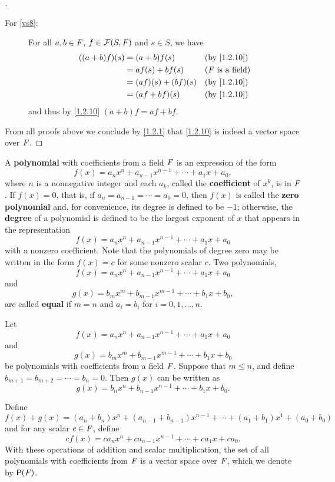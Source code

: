 \begin{proof}[]
\begin{description}
		\item[For \ref{vs8}:]
			For all \(a, b \in \mathit{F}\), \(f \in \FS\) and \(s \in S\), we have
			\begin{align*}
				((a + b) f)(s) & = (a + b) f(s)      &  & \text{(by \cref{1.2.10})}  \\
				               & = af(s) + bf(s)     &  & \text{(\(\F\) is a field)} \\
				               & = (af)(s) + (bf)(s) &  & \text{(by \cref{1.2.10})}  \\
				               & = (af + bf)(s)      &  & \text{(by \cref{1.2.10})}
			\end{align*}
			and thus by \cref{1.2.10} \((a + b) f = af + bf\).
	\end{description}
	From all proofs above we conclude by \cref{1.2.1} that \cref{1.2.10} is indeed a vector space over \(\mathit{F}\).
\end{proof}

\begin{defn}\label{1.2.11}
	A \textbf{polynomial} with coefficients from a field \(\mathit{F}\) is an expression of the form
	\[
		f(x) = a_n x^n + a_{n - 1} x^{n - 1} + \cdots + a_1 x + a_0,
	\]
	where \(n\) is a nonnegative integer and each \(a_k\), called the \textbf{coefficient} of \(x^k\), is in \(\mathit{F}\).
	If \(f(x) = 0\), that is, if \(a_n = a_{n - 1} = \cdots = a_0 = 0\), then \(f(x)\) is called the \textbf{zero polynomial} and, for convenience, its degree is defined to be \(-1\);
	otherwise, the \textbf{degree} of a polynomial is defined to be the largest exponent of \(x\) that appears in the representation
	\[
		f(x) = a_n x^n + a_{n - 1} x^{n - 1} + \cdots + a_1 x + a_0
	\]
	with a nonzero coefficient.
	Note that the polynomials of degree zero may be written in the form \(f(x) = c\) for some nonzero scalar \(c\).
	Two polynomials,
	\[
		f(x) = a_n x^n + a_{n - 1} x^{n - 1} + \cdots + a_1 x + a_0
	\]
	and
	\[
		g(x) = b_m x^m + b_{m - 1} x^{m - 1} + \cdots + b_1 x + b_0,
	\]
	are called \textbf{equal} if \(m = n\) and \(a_i = b_i\) for \(i = 0, 1, \dots, n\).
\end{defn}

\begin{eg}\label{1.2.12}
	Let
	\[
		f(x) = a_n x^n + a_{n - 1} x^{n - 1} + \cdots + a_1 x + a_0
	\]
	and
	\[
		g(x) = b_m x^m + b_{m - 1} x^{m - 1} + \cdots + b_1 x + b_0
	\]
	be polynomials with coefficients from a field \(\mathit{F}\).
	Suppose that \(m \leq n\), and define \(b_{m + 1} = b_{m + 2} = \cdots = b_n = 0\).
	Then \(g(x)\) can be written as
	\[
		g(x) = b_n x^n + b_{n - 1} x^{n - 1} + \cdots + b_1 x + b_0.
	\]

	Define
	\[
		f(x) + g(x) = (a_n + b_n) x^n + (a_{n - 1} + b_{n - 1}) x^{n - 1} + \cdots + (a_1 + b_1) x^1 + (a_0 + b_0)
	\]
	and for any scalar \(c \in \mathit{F}\), define
	\[
		cf(x) = ca_n x^n + ca_{n - 1} x^{n - 1} + \cdots + ca_1 x + ca_0.
	\]
	With these operations of addition and scalar multiplication, the set of all polynomials with coefficients from \(\mathit{F}\) is a vector space over \(\mathit{F}\), which we denote by \(\ps{\F}\).
\end{eg}

